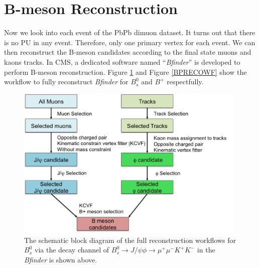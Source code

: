 
\section{B-meson Reconstruction} 

Now we look into each event of the PbPb dimuon dataset. It turns out that there is no PU in any event. Therefore, only one primary vertex for each event. We can then reconstruct the B-meson candidates according to the final state muons and kaons tracks. In CMS, a dedicated software named ``\textit{Bfinder}'' is developed to perform B-meson reconstruction. Figure \ref{BsRECOWF} and Figure \ref{BPRECOWF} show the workflow to fully reconstruct \textit{Bfinder} for $B^0_s$ and $B^+$ respectfully.


\begin{figure}[h]
\begin{center}
\includegraphics[width= 0.98\textwidth]{Figures/Chapter5/BsmesonWorkflow.png}
\caption{The schematic block diagram of the full reconstruction workflows for $B^0_s$ via the decay channel of $B_s^0 \rightarrow J/\psi \phi \rightarrow \mu^+\mu^- K^+K^-$ in the \textit{Bfinder} is shown above.}
\label{BsRECOWF}
\end{center}
\end{figure}

